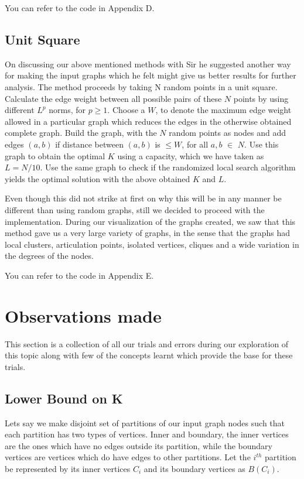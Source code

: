 \documentclass[12pt,a4paper,onecolumn]{article}
\begin{document}
You can refer to the code in Appendix D.

\subsection{Unit Square}
On discussing our above mentioned methods with Sir he suggested another way for making the input graphs which he felt might give us better  results for further analysis. 
The method proceeds by taking N random points in a unit square.
Calculate the edge weight between all possible pairs of these $N$ points by using different $L^p$ norms, for $p \geq 1$.
Choose a $W$, to denote the maximum edge weight allowed in a particular graph which reduces the edges in the otherwise obtained complete graph. 
Build the graph, with the $N$ random points as nodes and add edges $(a,b)$ if distance between $(a,b)$ is $\leq W$, for all $a,b$ $\in$ $N$. 
Use this graph to obtain the optimal $K$ using a capacity, which we have taken as $L = N/10$.
Use the same graph to check if the randomized local search algorithm yields the optimal solution with the above obtained $K$ and $L$.


Even though this did not strike at first on why this will be in any manner be different than using random graphs, still we decided to proceed with the implementation. During our visualization of the graphs created, we saw that this method gave us a very large variety of graphs, in the sense that the graphs had local clusters, articulation points, isolated vertices, cliques and a wide variation in the degrees of the nodes.

You can refer to the code in Appendix E.
\section{Observations made}
This section is a collection of all our trials and errors during our exploration of this topic along with few of the concepts learnt which provide the base for these trials.
\subsection{Lower Bound on K}
Lets say we make disjoint set of partitions of our input graph nodes such that each partition has two types of vertices. Inner and boundary, the inner vertices are the ones which have no edges outside its partition, while the boundary vertices are vertices which do have edges to other partitions. Let the $i^{th}$ partition be represented by its inner vertices $C_i$ and its boundary vertices as $B(C_i)$.
\end{document}
